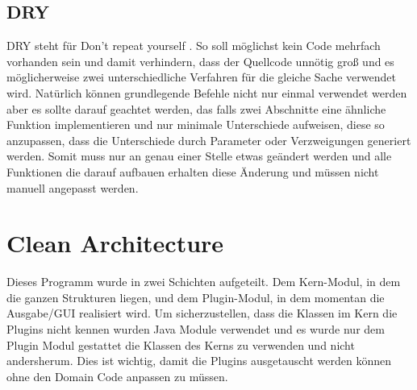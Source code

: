 \documentclass[12pt]{article}
\begin{document}
\subsection{DRY}
DRY steht für \glqq Don't repeat yourself \grqq. So soll möglichst kein Code mehrfach vorhanden sein und damit verhindern, dass der Quellcode unnötig groß und es möglicherweise zwei unterschiedliche Verfahren für die gleiche Sache verwendet wird. Natürlich können grundlegende Befehle nicht nur einmal verwendet werden aber es sollte darauf geachtet werden, das falls zwei Abschnitte eine ähnliche Funktion implementieren und nur minimale Unterschiede aufweisen, diese so anzupassen, dass die Unterschiede durch Parameter oder Verzweigungen generiert werden. Somit muss nur an genau einer Stelle etwas geändert werden und alle Funktionen die darauf aufbauen erhalten diese Änderung und müssen nicht manuell angepasst werden.



\newpage
\section{Clean Architecture}
Dieses Programm wurde in zwei Schichten aufgeteilt. Dem Kern-Modul, in dem die ganzen Strukturen liegen, und dem Plugin-Modul, in dem momentan die Ausgabe/GUI realisiert wird. Um sicherzustellen, dass die Klassen im Kern die Plugins nicht kennen wurden Java Module verwendet und es wurde nur dem Plugin Modul gestattet die Klassen des Kerns zu verwenden und nicht andersherum. Dies ist wichtig, damit die Plugins ausgetauscht werden können ohne den Domain Code anpassen zu müssen.
\\
\end{document}
